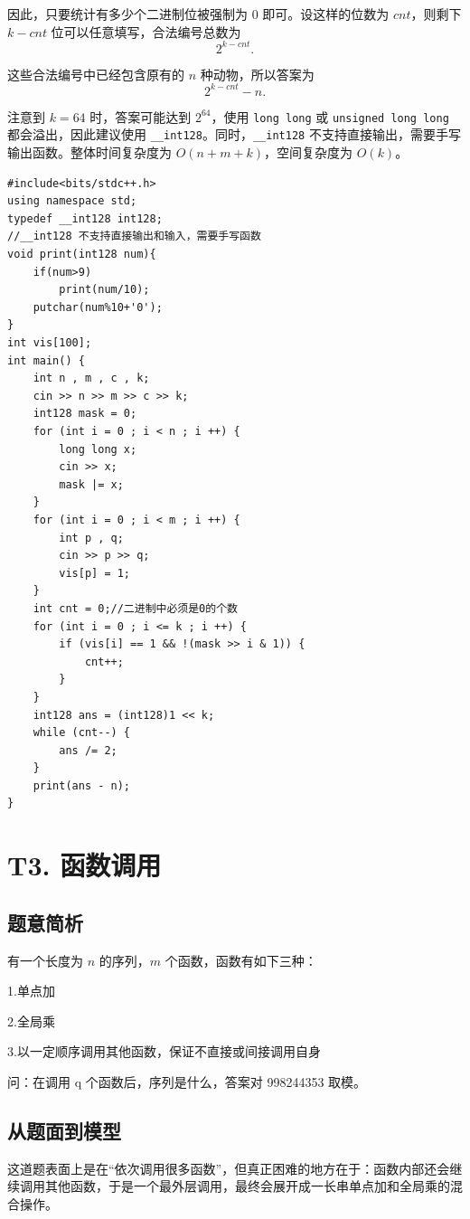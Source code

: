 \documentclass{book}
\newcommand{\code}[1]{\colorbox{codebg}{\texttt{#1}}}  %
\begin{document}
因此，只要统计有多少个二进制位被强制为 $0$ 即可。设这样的位数为 $cnt$，则剩下 $k-cnt$ 位可以任意填写，合法编号总数为
\[
2^{k-cnt}.
\]

这些合法编号中已经包含原有的 $n$ 种动物，所以答案为
\[
2^{k-cnt}-n.
\]

注意到 $k=64$ 时，答案可能达到 $2^{64}$，使用 \code{long long} 或 \code{unsigned long long} 都会溢出，因此建议使用 \code{\_\_int128}。同时，\code{\_\_int128} 不支持直接输出，需要手写输出函数。整体时间复杂度为 $O(n+m+k)$，空间复杂度为 $O(k)$。
\newpage
\begin{lstlisting}[style = code]
#include<bits/stdc++.h>
using namespace std;
typedef __int128 int128;
//__int128 不支持直接输出和输入，需要手写函数
void print(int128 num){
    if(num>9)
        print(num/10);
    putchar(num%10+'0');
}
int vis[100];
int main() {
    int n , m , c , k;
    cin >> n >> m >> c >> k;
    int128 mask = 0;
    for (int i = 0 ; i < n ; i ++) {
        long long x;
        cin >> x;
        mask |= x;
    }
    for (int i = 0 ; i < m ; i ++) {
        int p , q;
        cin >> p >> q;
        vis[p] = 1;
    }
    int cnt = 0;//二进制中必须是0的个数
    for (int i = 0 ; i <= k ; i ++) {
        if (vis[i] == 1 && !(mask >> i & 1)) {
            cnt++;
        }
    }
    int128 ans = (int128)1 << k;
    while (cnt--) {
        ans /= 2;
    }
    print(ans - n);
}\end{lstlisting}   


\newpage
\section{T3. 函数调用} %
    
    
\subsection{题意简析}
有一个长度为 $n$ 的序列，$m$ 个函数，函数有如下三种：

1.单点加

2.全局乘

3.以一定顺序调用其他函数，保证不直接或间接调用自身

问：在调用 q 个函数后，序列是什么，答案对 998244353 取模。

\subsection{从题面到模型}

这道题表面上是在“依次调用很多函数”，但真正困难的地方在于：函数内部还会继续调用其他函数，于是一个最外层调用，最终会展开成一长串单点加和全局乘的混合操作。
\end{document}

